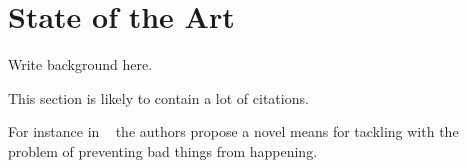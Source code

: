 \chapter{State of the Art}
\label{chap:background}

Write background here.

This section is likely to contain a lot of citations.

For instance in ~\cite{AnzengruberSocInfo2013} the authors propose a novel means for tackling with the problem of preventing bad things from happening.
